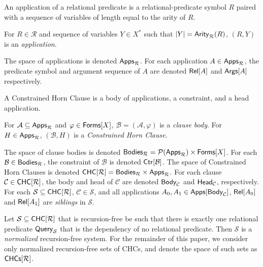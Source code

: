 An application of a relational predicate is a relational-predicate
symbol $R$ paired with a sequence of variables of length equal to the
arity of $R$.
%
\begin{defn}
  \label{defn:pred-apps}
  For $R \in \mathcal{R}$ and sequence of variables $Y \in X^{*}$ such
  that $|Y| = \mathsf{Arity}_{\mathcal{R}}(R)$, $(R, Y)$ is an
  \emph{application}.
\end{defn}
%
The space of applications is denoted $\mathsf{Apps}_{\mathcal{R}}$.
%
For each application $A \in \mathsf{Apps}_{\mathcal{R}}$, the predicate symbol
and argument sequence of $A$ are denoted $\mathsf{Rel}[ A ]$ and $\mathsf{Args}[ A ]$
respectively.

A Constrained Horn Clause is a body of applications, a constraint, and
a head application.
%
\begin{defn}
  \label{defn:chcs-structure}
  For $\mathcal{A} \subseteq \mathsf{Apps}_{\mathcal{R}}$ and %
  $\varphi \in \mathsf{Forms}[ X ]$, $\mathcal{B} = (\mathcal{A}, \varphi)$
  is a \emph{clause body}.
  For $H \in \mathsf{Apps}_{\mathcal{R}}$, $(\mathcal{B}, H)$ is a
  \emph{Constrained Horn Clause}.
\end{defn}
The space of clause bodies is denoted $\mathsf{Bodies}_{ \mathcal{R} } =
\mathcal{P}(\mathsf{Apps}_{\mathcal{R}}) \times \mathsf{Forms}[ X ]$.
%
For each $\mathcal{B} \in \mathsf{Bodies}_{ \mathcal{R} }$, the constraint of
$\mathcal{B}$ is denoted $\mathsf{Ctr}[ \mathcal{B} ]$.
The space of Constrained Horn Clauses is denoted $\mathsf{CHC}[  \mathcal{R}  ]
= \mathsf{Bodies}_{ \mathcal{R} } \times \mathsf{Apps}_{ \mathcal{R} }$.
%
For each clause $\mathcal{C} \in \mathsf{CHC}[ \mathcal{R} ]$, the body and head
of $\mathcal{C}$ are denoted $\mathsf{Body}_{ \mathcal{C} }$ and $\mathsf{Head}_{
  \mathcal{C} }$, respectively.
For each $\mathcal{S} \subseteq \mathsf{CHC}[  \mathcal{R}  ]$, $\mathcal{C} \in
\mathcal{S}$, and all applications $A_0, A_1 \in \mathsf{Apps}[  \mathsf{Body}_{
    \mathcal{C} }  ]$, $\mathsf{Rel}[ A_0 ]$ and $\mathsf{Rel}[ A_1 ]$ are
\emph{siblings} in $\mathcal{S}$.

Let $\mathcal{S} \subseteq \mathsf{CHC}[  \mathcal{R}  ]$ that is recursion-free
be such that there is exactly one relational predicate $\mathsf{Query}_{
  \mathcal{S} }$ that is the dependency of no relational predicate.
%
Then $\mathcal{S}$ is a \emph{normalized} recursion-free system.
%
For the remainder of this paper, we consider only normalized
recursion-free sets of CHCs, and denote the space of such sets as
$\mathsf{CHCs}[  \mathcal{R}  ]$.

